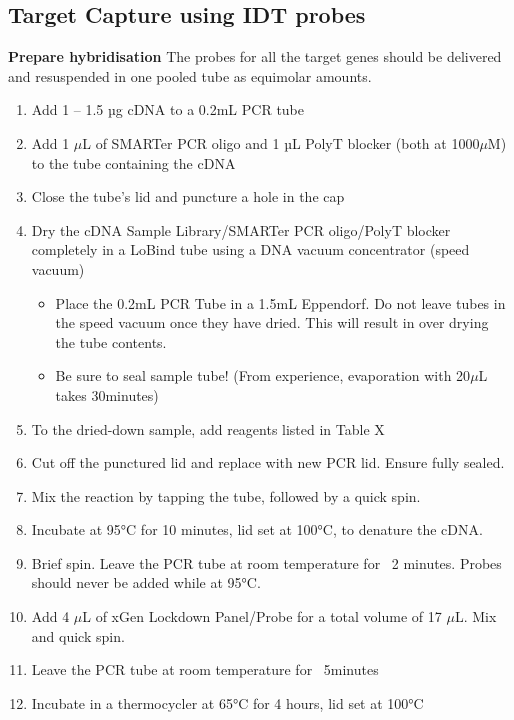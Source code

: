 \subsection{Target Capture using IDT probes} 
\textbf{Prepare hybridisation}
The probes for all the target genes should be delivered and resuspended in one pooled tube as equimolar amounts. 
\begin{enumerate}
	\item Add 1 – 1.5 µg cDNA to a 0.2mL PCR tube 
	\item Add 1 $\mu$L of SMARTer PCR oligo and 1 µL PolyT blocker (both at 1000$\mu$M) to the tube containing the cDNA
	\item Close the tube’s lid and puncture a hole in the cap 
	\item Dry the cDNA Sample Library/SMARTer PCR oligo/PolyT blocker completely in a LoBind tube using a DNA vacuum concentrator (speed vacuum)
	\begin{itemize}
		\item Place the 0.2mL PCR Tube in a 1.5mL Eppendorf. Do not leave tubes in the speed vacuum once they have dried. This will result in over drying the tube contents.
		\item Be sure to seal sample tube! (From experience, evaporation with 20$\mu$L takes 30minutes)
	\end{itemize}
	\item To the dried-down sample, add reagents listed in Table X 
	\item Cut off the punctured lid and replace with new PCR lid. Ensure fully sealed.
	\item Mix the reaction by tapping the tube, followed by a quick spin. 
	\item Incubate at 95°C for 10 minutes, lid set at 100°C, to denature the cDNA. 
	\item Brief spin. Leave the PCR tube at room temperature for ~2 minutes. Probes should never be added while at 95°C. 
	\item Add 4 $\mu$L of xGen Lockdown Panel/Probe for a total volume of 17 $\mu$L. Mix and quick spin. 
	\item Leave the PCR tube at room temperature for ~5minutes
	\item Incubate in a thermocycler at 65°C for 4 hours, lid set at 100°C 
\end{enumerate} 

